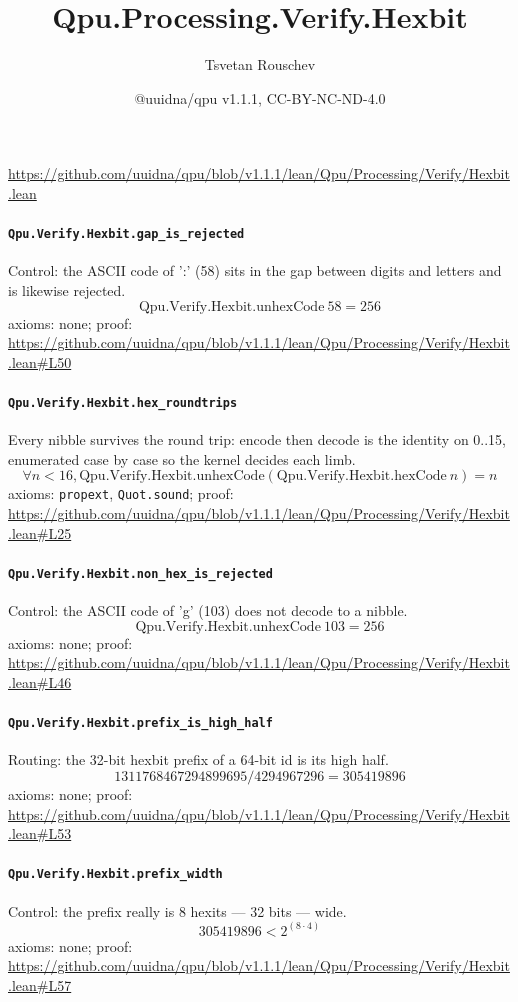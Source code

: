 \documentclass[11pt]{article}
\title{Qpu.Processing.Verify.Hexbit}
\author{Tsvetan Rouschev}
\date{@uuidna/qpu v1.1.1, CC-BY-NC-ND-4.0}
\begin{document}
\maketitle
\noindent\url{https://github.com/uuidna/qpu/blob/v1.1.1/lean/Qpu/Processing/Verify/Hexbit.lean}

\paragraph{\texttt{Qpu.Verify.Hexbit.gap\_is\_rejected}}
Control: the ASCII code of ':' (58) sits in the gap between digits and letters and is likewise rejected.
\[ \mathrm{Qpu.Verify.Hexbit.unhexCode}\ 58 = 256 \]
\noindent axioms: none; proof: \url{https://github.com/uuidna/qpu/blob/v1.1.1/lean/Qpu/Processing/Verify/Hexbit.lean\#L50}

\paragraph{\texttt{Qpu.Verify.Hexbit.hex\_roundtrips}}
Every nibble survives the round trip: encode then decode is the identity on 0..15, enumerated case by case so the kernel decides each limb.
\[ \forall n < 16, \mathrm{Qpu.Verify.Hexbit.unhexCode} (\mathrm{Qpu.Verify.Hexbit.hexCode}\ n) = n \]
\noindent axioms: \texttt{propext}, \texttt{Quot.sound}; proof: \url{https://github.com/uuidna/qpu/blob/v1.1.1/lean/Qpu/Processing/Verify/Hexbit.lean\#L25}

\paragraph{\texttt{Qpu.Verify.Hexbit.non\_hex\_is\_rejected}}
Control: the ASCII code of 'g' (103) does not decode to a nibble.
\[ \mathrm{Qpu.Verify.Hexbit.unhexCode}\ 103 = 256 \]
\noindent axioms: none; proof: \url{https://github.com/uuidna/qpu/blob/v1.1.1/lean/Qpu/Processing/Verify/Hexbit.lean\#L46}

\paragraph{\texttt{Qpu.Verify.Hexbit.prefix\_is\_high\_half}}
Routing: the 32-bit hexbit prefix of a 64-bit id is its high half.
\[ 1311768467294899695 / 4294967296 = 305419896 \]
\noindent axioms: none; proof: \url{https://github.com/uuidna/qpu/blob/v1.1.1/lean/Qpu/Processing/Verify/Hexbit.lean\#L53}

\paragraph{\texttt{Qpu.Verify.Hexbit.prefix\_width}}
Control: the prefix really is 8 hexits — 32 bits — wide.
\[ 305419896 < 2 ^{(8 \cdot 4)} \]
\noindent axioms: none; proof: \url{https://github.com/uuidna/qpu/blob/v1.1.1/lean/Qpu/Processing/Verify/Hexbit.lean\#L57}
\end{document}
